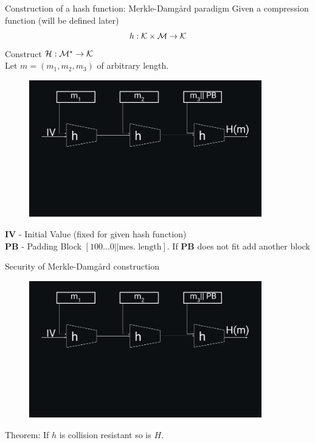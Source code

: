 \documentclass[usenames,dvipsnames, 9pt]{beamer}
\begin{document}
\begin{frame}{Construction of a hash function: Merkle-Damg\aa rd paradigm}
\Large
Given a compression function (will be defined later) \[h: \mathcal{K} \times \mathcal{M} \rightarrow \mathcal{K}\]
Construct $\mathcal{H}: \mathcal{M}^\star \rightarrow \mathcal{K}$ \\

Let $m = (m_1, m_2, m_3 )$ of arbitrary length.
	\begin{figure}
		\includegraphics[width=0.9\textwidth]{MerkleDamgard}
	\end{figure}
\vspace{-60pt}
\textbf{IV} - Initial Value (fixed for given hash function) \\
\textbf{PB} - Padding Block $\left[100\ldots0 || \text{mes.\ length}\right]$. If \textbf{PB}  does not fit add another block

\end{frame}

\begin{frame}{Security of Merkle-Damg\aa rd construction}
\begin{figure}
	\includegraphics[width=0.9\textwidth]{MerkleDamgard}
\end{figure}
\vspace{-60pt}
\LARGE
{\color{Orange} Theorem:} If $h$ is collision resistant so is $H$.

\end{frame}
\end{document}
